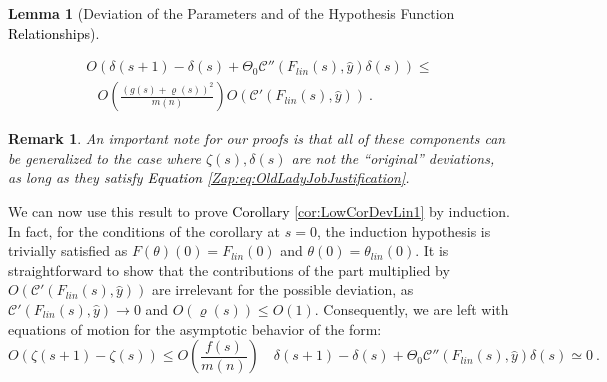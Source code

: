 \documentclass{article} %
\newtheorem{lemma}[theorem]{Lemma}
\newtheorem{remark}{Remark}
[section]
\begin{document}
\begin{lemma}[Deviation of the Parameters and of the Hypothesis Function \textcolor{black}{Relationships}]
{\begin{enumerate}
\begin{equation}
\begin{array}{c}
O\left(\delta\left(s+1\right)-\delta\left(s\right)+\Theta_{0}\mathcal{C}''\left(F_{lin}\left(s\right),\hat{y}\right)\delta\left(s\right)\right)\leq\\
\begin{array}{c}
\\
\\
\end{array}O\left(\frac{\left(g\left(s\right)+\varrho\left(s\right)\right)^{2}}{m\left(n\right)}\right)O\left(\mathcal{C}'\left(F_{lin}\left(s\right),\hat{y}\right)\right) \ .
\end{array}
\label{Zap:eq:KingZuko}
\end{equation}
\end{enumerate}
}
\end{lemma}

\begin{remark}
\textup{An important note for our proofs is that all of these components can be generalized to the case where \(\zeta(s),\delta(s)\) are not the ``original'' deviations, as long as they satisfy \textcolor{black}{Equation} \ref{Zap:eq:OldLadyJobJustification}.}
\end{remark}

We can now use this result to prove \textcolor{black}{Corollary} \ref{cor:LowCorDevLin1} by induction. In fact, for the conditions of the corollary at \(s=0\), the induction hypothesis is trivially satisfied as \(F(\theta)(0)=F_{lin}(0)\) and \(\theta(0)=\theta_{lin}(0)\). It is straightforward to show that the contributions of the part multiplied by \(O\left(\mathcal{C}'\left(F_{lin}\left(s\right),\hat{y}\right)\right)\) are irrelevant for the possible deviation, as \(\mathcal{C}'\left(F_{lin}\left(s\right),\hat{y}\right)\rightarrow 0\) and \(O\left(\varrho\left(s\right)\right)\leq O\left(1\right)\). Consequently, we are left with equations of motion for the asymptotic behavior of the form:
\begin{equation}
O\left(\zeta\left(s+1\right)-\zeta\left(s\right)\right)\leq O\left(\frac{f\left(s\right)}{m\left(n\right)}\right)\quad
\delta\left(s+1\right)-\delta\left(s\right)+\Theta_{0}\mathcal{C}''\left(F_{lin}\left(s\right),\hat{y}\right)\delta\left(s\right)\simeq0 \ .
\label{zap:eq:BiSS}
\end{equation}
\end{document}
